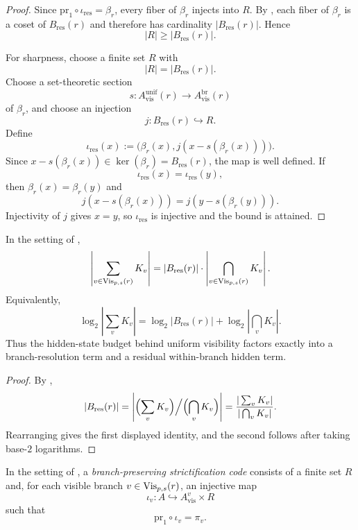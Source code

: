 \begin{proof}
Since $\mathrm{pr}_1\circ \iota_{\mathrm{res}}=\beta_r$, every fiber of $\beta_r$ injects into $R$. By , each fiber of $\beta_r$ is a coset of $B_{\mathrm{res}}(r)$ and therefore has cardinality $|B_{\mathrm{res}}(r)|$. Hence
\[
|R|\ge |B_{\mathrm{res}}(r)|.
\]

For sharpness, choose a finite set $R$ with
\[
|R|=|B_{\mathrm{res}}(r)|.
\]
Choose a set-theoretic section
\[
s:A_{\mathrm{vis}}^{\mathrm{unif}}(r)\to A_{\mathrm{vis}}^{\mathrm{br}}(r)
\]
of $\beta_r$, and choose an injection
\[
j:B_{\mathrm{res}}(r)\hookrightarrow R.
\]
Define
\[
\iota_{\mathrm{res}}(x):=
\bigl(\beta_r(x),j(x-s(\beta_r(x)))\bigr).
\]
Since $x-s(\beta_r(x))\in \ker(\beta_r)=B_{\mathrm{res}}(r)$, the map is well defined. If
\[
\iota_{\mathrm{res}}(x)=\iota_{\mathrm{res}}(y),
\]
then $\beta_r(x)=\beta_r(y)$ and
\[
j(x-s(\beta_r(x)))=j(y-s(\beta_r(y))).
\]
Injectivity of $j$ gives $x=y$, so $\iota_{\mathrm{res}}$ is injective and the bound is attained.
\end{proof}

\begin{corollary}\label{cor:uniform-hidden-budget-factorization}
In the setting of ,
\[
\left|\sum_{v\in \mathrm{Vis}_{p,s}(r)} K_v\right|
=
|B_{\mathrm{res}}(r)|
\cdot
\left|\bigcap_{v\in \mathrm{Vis}_{p,s}(r)} K_v\right|.
\]
Equivalently,
\[
\log_2\left|\sum_v K_v\right|
=
\log_2|B_{\mathrm{res}}(r)|
+
\log_2\left|\bigcap_v K_v\right|.
\]
Thus the hidden-state budget behind uniform visibility factors exactly into a branch-resolution term and a residual within-branch hidden term.
\end{corollary}

\begin{proof}
By ,
\[
|B_{\mathrm{res}}(r)|
=
\left|\Bigl(\sum_v K_v\Bigr)\Big/\Bigl(\bigcap_v K_v\Bigr)\right|
=
\frac{|\sum_v K_v|}{|\bigcap_v K_v|}.
\]
Rearranging gives the first displayed identity, and the second follows after taking base-$2$ logarithms.
\end{proof}

\begin{definition}\label{def:branch-preserving-strictification-code}
In the setting of , a \emph{branch-preserving strictification code} consists of a finite set $R$ and, for each visible branch $v\in \mathrm{Vis}_{p,s}(r)$, an injective map
\[
\iota_v:A\hookrightarrow A_{\mathrm{vis}}^v\times R
\]
such that
\[
\mathrm{pr}_1\circ \iota_v=\pi_v.
\]
\end{definition}

